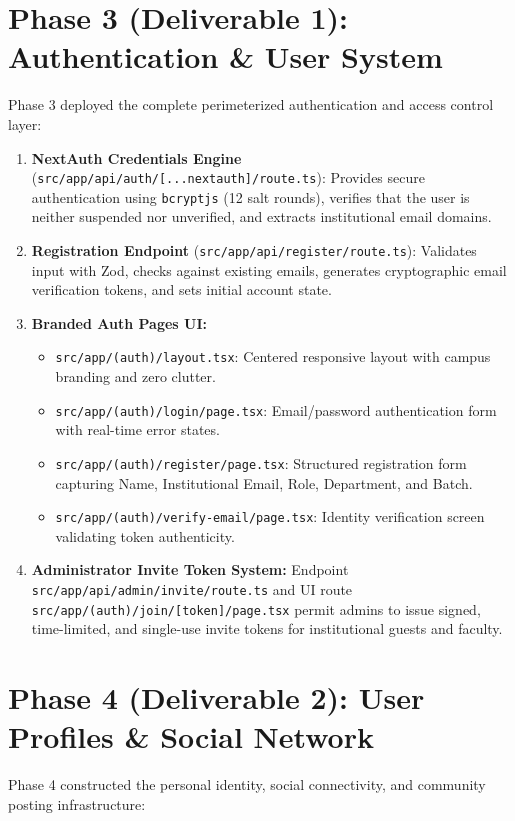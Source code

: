 \documentclass[11pt,a4paper]{report}
\begin{document}
\section{Phase 3 (Deliverable 1): Authentication \& User System}

Phase 3 deployed the complete perimeterized authentication and access control layer:

\begin{enumerate}
    \item \textbf{NextAuth Credentials Engine} (\texttt{src/app/api/auth/[...nextauth]/route.ts}): Provides secure authentication using \texttt{bcryptjs} (12 salt rounds), verifies that the user is neither suspended nor unverified, and extracts institutional email domains.
    \item \textbf{Registration Endpoint} (\texttt{src/app/api/register/route.ts}): Validates input with Zod, checks against existing emails, generates cryptographic email verification tokens, and sets initial account state.
    \item \textbf{Branded Auth Pages UI:}
    \begin{itemize}
        \item \texttt{src/app/(auth)/layout.tsx}: Centered responsive layout with campus branding and zero clutter.
        \item \texttt{src/app/(auth)/login/page.tsx}: Email/password authentication form with real-time error states.
        \item \texttt{src/app/(auth)/register/page.tsx}: Structured registration form capturing Name, Institutional Email, Role, Department, and Batch.
        \item \texttt{src/app/(auth)/verify-email/page.tsx}: Identity verification screen validating token authenticity.
    \end{itemize}
    \item \textbf{Administrator Invite Token System:} Endpoint \texttt{src/app/api/admin/invite/route.ts} and UI route \texttt{src/app/(auth)/join/[token]/page.tsx} permit admins to issue signed, time-limited, and single-use invite tokens for institutional guests and faculty.
\end{enumerate}

\section{Phase 4 (Deliverable 2): User Profiles \& Social Network}

Phase 4 constructed the personal identity, social connectivity, and community posting infrastructure:
\end{document}
